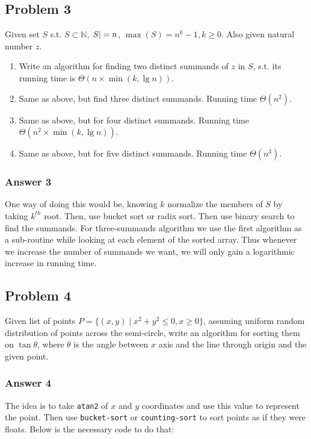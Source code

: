 \documentclass[11pt]{article}
\begin{document}
\subsection{Problem 3}
\label{sec-1-3}
Given set $S$ s.t. $S \subset \mathbb{N}$, $\abs{S} = n$, $\max(S) = n^k-1, k
   \geq 0$.  Also given natural number $z$.
\begin{enumerate}
\item Write an algorithm for finding two distinct summands of $z$ in $S$,
s.t. its running time is $\Theta(n \times \min(k, \lg n))$.
\item Same as above, but find three distinct summands.  Running time
$\Theta(n^2)$.
\item Same as above, but for four distinct summands.  Running time $\Theta(n^2
      \times \min(k, \lg n))$.
\item Same as above, but for five distinct summands.  Running time
$\Theta(n^3)$.
\end{enumerate}

\subsubsection{Answer 3}
\label{sec-1-3-1}
One way of doing this would be, knowing $k$ normalize the members of $S$ by
taking $k^{th}$ root.  Then, use bucket sort or radix sort.  Then use binary
search to find the summands.
For three-summands algorithm we use the first algorithm as a sub-routine 
while looking at each element of the sorted array.  Thus whenever we increase
the number of summands we want, we will only gain a logarithmic increase in
running time.

\subsection{Problem 4}
\label{sec-1-4}
Given list of points $P = \{(x, y) \;|\; x^2 + y^2 \leq 0, x \geq 0\}$,
assuming uniform random distribution of points across the semi-circle, write
an algorithm for sorting them on $\tan \theta$, where $\theta$ is the angle
between $x$ axis and the line through origin and the given point.

\subsubsection{Answer 4}
\label{sec-1-4-1}
The idea is to take \texttt{atan2} of $x$ and $y$ coordinates and use this value
to represent the point.  Then use \texttt{bucket-sort} or \texttt{counting-sort} to sort
points as if they were floats.  Below is the necessary code to do that:
\end{document}
